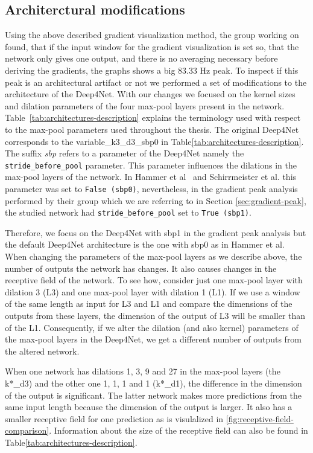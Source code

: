 \subsection{Architerctural modifications}
Using the above described gradient visualization method, the group working on~\cite{Hammer-2021} found, that if the input window for the gradient visualization is set so, that the network only gives one output, and there is no averaging necessary before deriving the gradients, the graphs shows a big 83.33 Hz peak.
To inspect if this peak is an architectural artifact or not we performed a set of modifications to the architecture of the Deep4Net.
With our changes we focused on the kernel sizes and dilation parameters of the four max-pool layers present in the network.
Table~\ref{tab:architectures-description} explains the terminology used with respect to the max-pool parameters used throughout the thesis.
The original Deep4Net corresponds to the {variable}\_k3\_d3\_sbp0 in Table\ref{tab:architectures-description}.
The suffix \textit{sbp} refers to a parameter of the Deep4Net namely the \texttt{stride\_before\_pool} parameter.
This parameter influences the dilations in the max-pool layers of the network. In Hammer et al~\cite{Hammer-2021} and Schirrmeister et al. \cite{schirrmeister-deep-2017}this parameter was set to \texttt{False (sbp0)}, nevertheless, in the gradient peak analysis performed by their group which we are referring to in Section \cref{sec:gradient-peak}, the studied network had \texttt{stride\_before\_pool} set to \texttt{True (sbp1)}.

Therefore, we focus on the Deep4Net with sbp1 in the gradient peak analysis but the default Deep4Net architecture is the one with sbp0 as in Hammer et al.
When changing the parameters of the max-pool layers as we describe above, the number of outputs the network has changes.
It also causes changes in the receptive field of the network.
To see how, consider just one max-pool layer with dilation 3 (L3) and one max-pool layer with dilation 1 (L1). If we use a window of the same length as input for L3 and L1 and compare the dimensions of the outputs from these layers, the dimension of the output of L3 will be smaller than of the L1.
Consequently, if we alter the dilation (and also kernel) parameters of the max-pool layers in the Deep4Net, we get a different number of outputs from the altered network. 

When one network has dilations 1, 3, 9 and 27 in the max-pool layers (the k*\_d3) and the other one 1, 1, 1 and 1 (k*\_d1), the difference in the dimension of the output is significant.
The latter network makes more predictions from the same input length because the dimension of the output is larger.
It also has a smaller receptive field for one prediction as is visulalized in \cref{fig:receptive-field-comparison}.
Information about the size of the receptive field can also be found in Table\ref{tab:architectures-description}.

